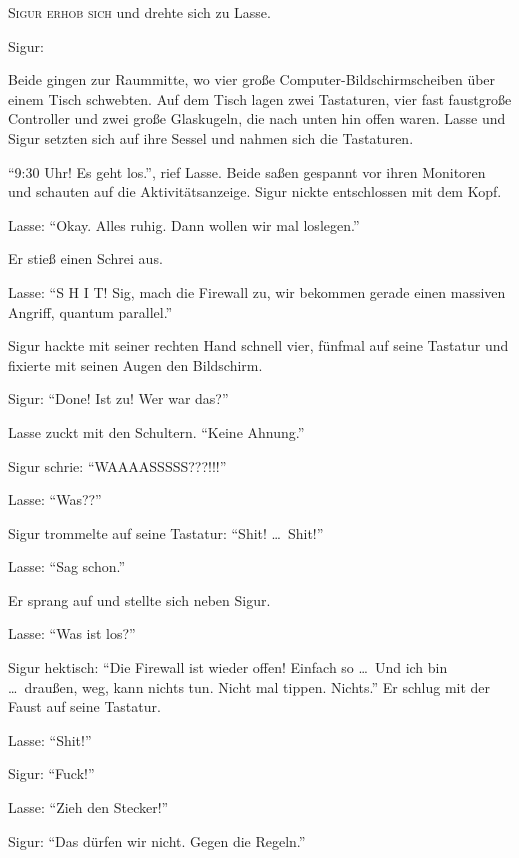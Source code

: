 \label{cha:2064_osiris_attacke}



\textsc{Sigur erhob sich} und drehte sich zu Lasse.

Sigur: 

Beide gingen zur Raummitte, wo vier große Computer-Bildschirmscheiben über einem Tisch schwebten.
Auf dem Tisch lagen zwei Tastaturen, vier fast faustgroße Controller und zwei große Glaskugeln, die nach unten hin offen waren.
Lasse und Sigur setzten sich auf ihre Sessel und nahmen sich die Tastaturen.

\enquote{9:30 Uhr! Es geht los.}, rief Lasse.
Beide saßen gespannt vor ihren Monitoren und schauten auf die Aktivitätsanzeige.
Sigur nickte entschlossen mit dem Kopf.

Lasse: \enquote{Okay.
Alles ruhig.
Dann wollen wir mal loslegen.} 

Er stieß einen Schrei aus.

Lasse: \enquote{S H I T! Sig, mach die Firewall zu, wir bekommen gerade einen massiven Angriff, quantum parallel.}

Sigur hackte mit seiner rechten Hand schnell vier, fünfmal auf seine Tastatur und fixierte  mit seinen Augen den Bildschirm.

Sigur: \enquote{Done! Ist zu! Wer war das?} 

Lasse zuckt mit den Schultern.
\enquote{Keine Ahnung.}

Sigur schrie: \enquote{WAAAASSSSS???!!!}

Lasse: \enquote{Was??}

Sigur trommelte auf seine Tastatur: \enquote{Shit! \dots\  Shit!}

Lasse: \enquote{Sag schon.} 

Er sprang auf und stellte sich neben Sigur.

Lasse: \enquote{Was ist los?}

Sigur hektisch: \enquote{Die Firewall ist wieder offen!
Einfach so \dots\
Und ich bin \dots\ draußen, weg, kann nichts tun.
Nicht mal tippen.
Nichts.}
Er schlug mit der Faust auf seine Tastatur.

Lasse: \enquote{Shit!}

Sigur: \enquote{Fuck!}

Lasse: \enquote{Zieh den Stecker!}

Sigur: \enquote{Das dürfen wir nicht.
Gegen die Regeln.}

